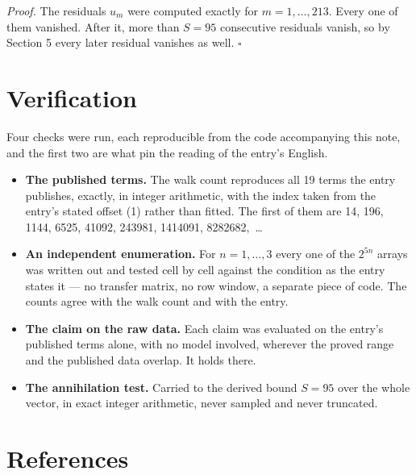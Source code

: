 \documentclass[11pt]{article}
\theoremstyle{definition}
\begin{document}
{\itshape Proof.} The residuals $u_m$ were computed exactly for $m = 1,\dots,213$. Every one of them vanished. After it, more than $S = 95$ consecutive residuals vanish, so by Section 5 every later residual vanishes as well. $\square$

\section{Verification}

Four checks were run, each reproducible from the code accompanying this note, and the first two are what pin the reading of the entry's English.

\begin{itemize}

\item {\bfseries The published terms.} The walk count reproduces all 19 terms the entry publishes, exactly, in integer arithmetic, with the index taken from the entry's stated offset (1) rather than fitted. The first of them are 14, 196, 1144, 6525, 41092, 243981, 1414091, 8282682,~\dots

\item {\bfseries An independent enumeration.} For $n = 1,\dots,3$ every one of the $2^{5n}$ arrays was written out and tested cell by cell against the condition as the entry states it --- no transfer matrix, no row window, a separate piece of code. The counts agree with the walk count and with the entry.

\item {\bfseries The claim on the raw data.} Each claim was evaluated on the entry's published terms alone, with no model involved, wherever the proved range and the published data overlap. It holds there.

\item {\bfseries The annihilation test.} Carried to the derived bound $S = 95$ over the whole vector, in exact integer arithmetic, never sampled and never truncated.

\end{itemize}

\section{References}
\end{document}
